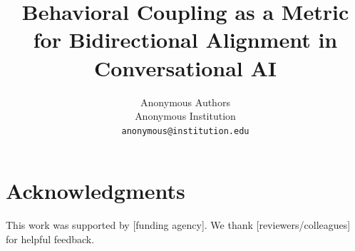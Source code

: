 \documentclass[11pt]{article}
\title{Behavioral Coupling as a Metric for Bidirectional Alignment in Conversational AI}
\author{
  Anonymous Authors\\
  Anonymous Institution\\
  \texttt{anonymous@institution.edu}
}
\date{}
\begin{document}
\maketitle











\section*{Acknowledgments}
This work was supported by [funding agency]. We thank [reviewers/colleagues] for helpful feedback.



\end{document}
